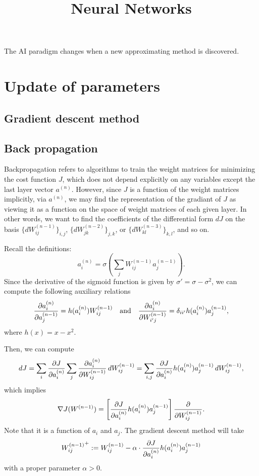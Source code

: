 \documentclass{../exp}
\title{Neural Networks}
\begin{document}
\maketitle

The AI paradigm changes when a new approximating method is discovered.




\section{Update of parameters}

\subsection{Gradient descent method}



\subsection{Back propagation}
Backpropagation refers to algorithms to train the weight matrices for minimizing the cost function $J$, which does not depend explicitly on any variables except the last layer vector $a^{(n)}$.
However, since $J$ is a function of the weight matrices implicitly, via $a^{(n)}$, we may find the representation of the gradiant of $J$ as viewing it as a function on the space of weight matrices of each given layer.
In other words, we want to find the coefficients of the differential form $dJ$ on the basis $\{dW_{ij}^{(n-1)}\}_{i,j}$, $\{dW_{jk}^{(n-2)}\}_{j,k}$, or $\{dW_{kl}^{(n-3)}\}_{k,l}$, and so on.

Recall the definitions:
\[a_i^{(n)}=\sigma\left(\sum_jW_{ij}^{(n-1)}a_j^{(n-1)}\right).\]
Since the derivative of the sigmoid function is given by $\sigma'=\sigma-\sigma^2$, we can compute the following auxiliary relations
\[\pd{a_i^{(n)}}{a_j^{(n-1)}}=h(a_i^{(n)})W_{ij}^{(n-1)}\c{and}\pd{a_i^{(n)}}{W_{i'j}^{(n-1)}}=\delta_{ii'}h(a_i^{(n)})a_j^{(n-1)},\]
where $h(x)=x-x^2$.

Then, we can compute
\[dJ=\sum_i\pd{J}{a_i^{(n)}}\sum_j\pd{a_i^{(n)}}{W_{ij}^{(n-1)}}\,dW_{ij}^{(n-1)}=\sum_{i,j}\pd{J}{a_i^{(n)}}h(a_i^{(n)})a_j^{(n-1)}\,dW_{ij}^{(n-1)},\]
which implies
\[\del J(W^{(n-1)})=\left[\pd{J}{a_i^{(n)}}h(a_i^{(n)})a_j^{(n-1)}\right]\pd{W_{ij}^{(n-1)}}.\]
Note that it is a function of $a_i$ and $a_j$.
The gradient descent method will take
\[{W_{ij}^{(n-1)}}^+:=W_{ij}^{(n-1)}-\alpha\cdot\pd{J}{a_i^{(n)}}h(a_i^{(n)})a_j^{(n-1)}\]
with a proper parameter $\alpha>0$.
\end{document}
